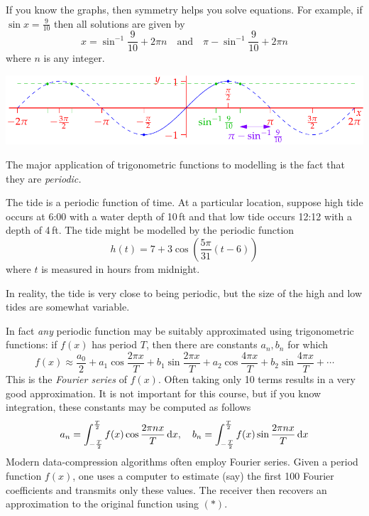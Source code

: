 \begin{example}{}{}
If you know the graphs, then symmetry helps you solve equations. For example, if $\sin x=\frac 9{10}$ then all solutions are given by
\[x=\sin^{-1}\frac 9{10}+2\pi n\quad\text{and}\quad \pi-\sin^{-1}\frac 9{10}+2\pi n\]
where $n$ is any integer.
\begin{center}
\includegraphics{invsine3}
\end{center}
\end{example}



The major application of trigonometric functions to modelling is the fact that they are \emph{periodic.}

\begin{example}{}{}
The tide is a periodic function of time. At a particular location, suppose high tide occurs at 6:00 with a water depth of 10\,ft and that low tide occurs 12:12 with a depth of 4\,ft. The tide might be modelled by the periodic function
\[h(t)=7+3\cos\left(\frac{5\pi}{31}(t-6)\right)\] 
where $t$ is measured in hours from midnight. 
\end{example}

In reality, the tide is very close to being periodic, but the size of the high and low tides are somewhat variable.\bigbreak

In fact \emph{any} periodic function may be suitably approximated using trigonometric functions: if $f(x)$ has period $T$, then there are constants $a_n,b_n$ for which
\[f(x)\approx \frac{a_0}2+a_1\cos\frac{2\pi x}T +b_1\sin\frac{2\pi x}T +a_2\cos\frac{4\pi x}T +b_2\sin\frac{4\pi x}T +\cdots \tag{$\ast$}\]
This is the \emph{Fourier series} of $f(x)$. Often taking only 10 terms results in a very good approximation. It is not important for this course, but if you know integration, these constants may be computed as follows
\[a_n=\int_{-\frac T2}^{\frac T2} f(x)\cos\frac{2\pi nx}T\,{\mathrm{d} x},\quad b_n=\int_{-\frac T2}^{\frac T2} f(x)\sin\frac{2\pi nx}T\,{\mathrm{d} x}\]
Modern data-compression algorithms often employ Fourier series. Given a period function $f(x)$, one uses a computer to estimate (say) the first 100 Fourier coefficients and transmits only these values. The receiver then recovers an approximation to the original function using $(\ast)$.

